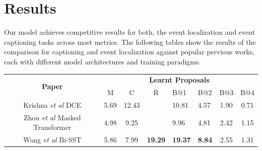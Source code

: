 \section{Results}

Our model achieves competitive results for both, the event localization and event captioning tasks across most metrics. The following tables show the results of the comparison for captioning and event localization against popular previous works, each with different model architectures and training paradigms.
\begin{table}[h] \label{table:capeval}
	\centering
	\begin{tabular}{|c|cclllcc|}
		\hline
		\multirow{2}{*}{\textbf{Paper}}        & \multicolumn{7}{c|}{\textbf{Learnt Proposals}}                                                                                                                                                                                                                        \\ \cline{2-8} 
		& \multicolumn{1}{c|}{M}             & \multicolumn{1}{c|}{C}              & \multicolumn{1}{c|}{R}               & \multicolumn{1}{l|}{B@1}             & \multicolumn{1}{l|}{B@2}           & \multicolumn{1}{c|}{B@3}           & B@4                                \\ \hline
		{Krishna \textit{et al} \cite{krishna2017densecaptioning} DCE}                                 & \multicolumn{1}{c|}{5.69}          & \multicolumn{1}{c|}{12.43}          & \multicolumn{1}{l|}{}                & \multicolumn{1}{l|}{10.81}           & \multicolumn{1}{l|}{4.57}          & \multicolumn{1}{c|}{1.90}          & 0.71                               \\ \hline
		{Zhou \textit{et al} \cite{zhou2018end} Masked Transformer}                & \multicolumn{1}{c|}{4.98}          & \multicolumn{1}{c|}{9.25}           & \multicolumn{1}{l|}{}                & \multicolumn{1}{l|}{9.96}            & \multicolumn{1}{l|}{4.81}          & \multicolumn{1}{c|}{2.42}          & 1.15                               \\ \hline
		{Wang \textit{et al} \cite{wang2018bidirectional} Bi-SST}                       & \multicolumn{1}{c|}{5.86}          & \multicolumn{1}{c|}{7.99}           & \multicolumn{1}{l|}{\textbf{19.29}}           & \multicolumn{1}{l|}{\textbf{19.37}}           & \multicolumn{1}{l|}{\textbf{8.84}}          & \multicolumn{1}{c|}{2.55}          & 1.31                               \\ \hline

\end{tabular}
\end{table}
